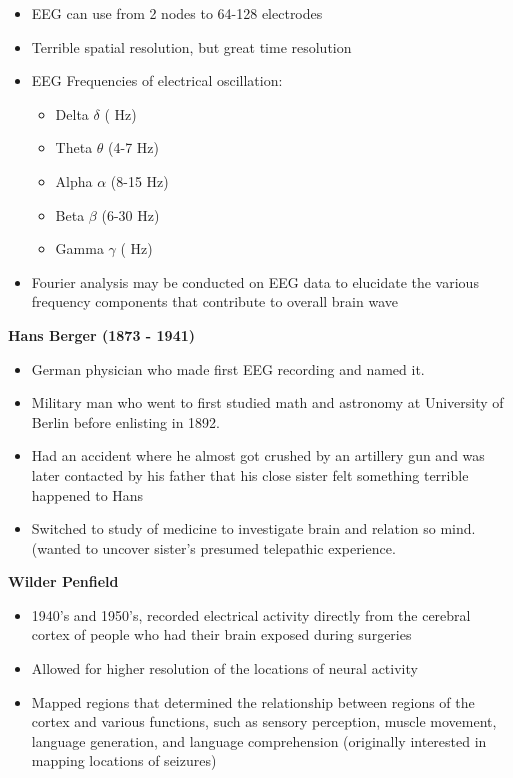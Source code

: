 \documentclass{article}
\begin{document}
\begin{itemize}
    \item EEG can use from 2 nodes to 64-128 electrodes
    \item Terrible spatial resolution, but great time resolution
    \item EEG Frequencies of electrical oscillation:
        \begin{itemize}
            \item Delta $\delta$ ( Hz)
            \item Theta $\theta$ (4-7 Hz)
            \item Alpha $\alpha$ (8-15 Hz)
            \item Beta $\beta$ (6-30 Hz)
            \item Gamma $\gamma$ ( Hz)
        \end{itemize}
    \item Fourier analysis may be conducted on EEG data to elucidate the various frequency components that contribute to overall brain wave
\end{itemize}

\noindent \textbf{Hans Berger (1873 - 1941)} 
\begin{itemize}
    \item German physician who made first EEG recording and named it. 
    \item Military man who went to first studied math and astronomy at University of Berlin before enlisting in 1892. 
    \item Had an accident where he almost got crushed by an artillery gun and was later contacted by his father that his close sister felt something terrible happened to Hans 
    \item Switched to study of medicine to investigate brain and relation so mind. (wanted to uncover sister's presumed telepathic experience. \\
\end{itemize}


\noindent \textbf{Wilder Penfield} 
\begin{itemize}
    \item 1940's and 1950's, recorded electrical activity directly from the cerebral cortex of people who had their brain exposed during surgeries
    \item Allowed for higher resolution of the locations of neural activity
    \item Mapped regions that determined the relationship between regions of the cortex and various functions, such as sensory perception, muscle movement, language generation, and language comprehension (originally interested in mapping locations of seizures)  
\end{itemize}
\end{document}
